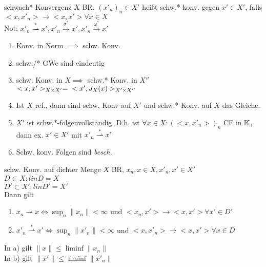 \begin{definition}{schwach* Konvergenz}
    \(X\) BR. \((x'_n)_n \in X'\) heißt schw.* konv. gegen \(x'\in X'\), falls
    \(<x,x'_n> \to <x,x'> \forall x\in X\)\\
    Not: \(x'_n \stackrel{*}{\rightharpoonup} x',
    x'_n \stackrel{\sigma^*}{\to} x', x'_n \stackrel{\omega^*}{\to}x'\)
\end{definition}

\begin{bemerkung}
    \begin{enumerate}
        \item Konv. in Norm \(\implies\) schw. Konv.
        \item schw./* GWe sind eindeutig
        \item schw. Konv. in \(X \implies\) schw.* Konv. in \(X''\)\\
            \(<x,x'>_{X\times X'} = \\ <x',J_X(x)>_{X' \times X''}\)
        \item Ist \(X\) ref., dann sind schw, Konv auf \(X'\) und schw.* Konv.
            auf \(X\) das Gleiche.
        \item \(X'\) ist schw.*-folgenvollständig. D.h. ist \(\forall x \in X:
            ( <x,x'_n>)_n\) CF in \(\mathbb{K}\), dann ex. \(x' \in X'\) mit 
            \(x'_n \stackrel{*}{\rightharpoonup}x'\)
        \item Schw. konv. Folgen sind \textit{besch.}
    \end{enumerate}
\end{bemerkung}

\begin{satz}{schw. Konv. auf dichter Menge}
    \(X\) BR, \(x_n,x\in X, x'_n,x'\in X'\)\\
    \(D\subset X: \overline{linD} = X\)\\
    \(D'\subset X': \overline{linD'} = X'\)\\
    Dann gilt
    \begin{enumerate}[label = (\alph*)]
        \item \(x_n \rightharpoonup x \Leftrightarrow \sup_n \|x_n\| < \infty\)
            und \(<x_n,x'> \to <x,x'> \forall x'\in D'\)
        \item \(x'_n \stackrel{*}{\rightharpoonup} x' \Leftrightarrow
            \sup_n \|x'_n\| < \infty\) und \(<x,x'_n> \to <x, x'>
            \forall x\in D\)
    \end{enumerate}
    In a) gilt \(\|x\| \leq \liminf \|x_n\|\)\\
    In b) gilt \(\|x'\| \leq \liminf \|x'_n\|\)
\end{satz}

